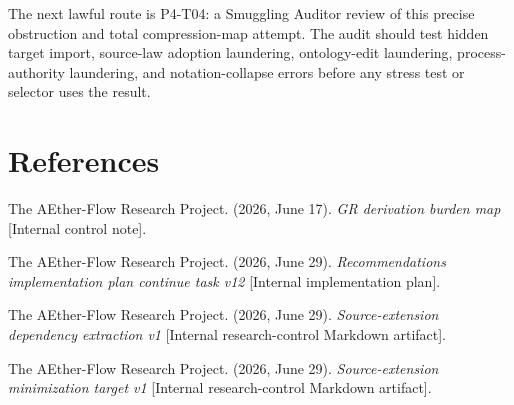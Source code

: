 \documentclass[11pt]{article}
\begin{document}
The next lawful route is P4-T04: a Smuggling Auditor review of this precise
obstruction and total compression-map attempt. The audit should test hidden
target import, source-law adoption laundering, ontology-edit laundering,
process-authority laundering, and notation-collapse errors before any stress
test or selector uses the result.

\section{References}

The AEther-Flow Research Project. (2026, June 17). \emph{GR derivation burden
map} [Internal control note].

The AEther-Flow Research Project. (2026, June 29). \emph{Recommendations
implementation plan continue task v12} [Internal implementation plan].

The AEther-Flow Research Project. (2026, June 29). \emph{Source-extension
dependency extraction v1} [Internal research-control Markdown artifact].

The AEther-Flow Research Project. (2026, June 29). \emph{Source-extension
minimization target v1} [Internal research-control Markdown artifact].
\end{document}
